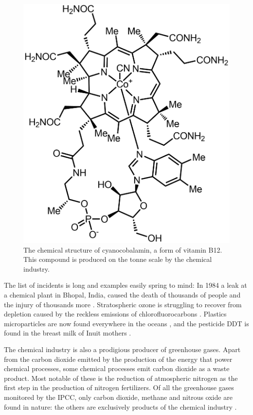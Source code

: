 \begin{figure}
\centering
\includegraphics[width=\textwidth]{Figures/Cyanocobalamin-b12.png}
\decoRule
\caption[Cyanocobalamin]{The chemical structure of cyanocobalamin, a form of vitamin B12. This compound is produced on the tonne scale by the chemical industry.}
\label{fig:vitb12}
\end{figure}

The list of incidents is long and examples easily spring to mind: In 1984 a leak
at a chemical plant in Bhopal, India, caused the death of thousands of people
and the injury of thousands more \autocite{Varma2005}.
Stratospheric ozone is struggling to recover from depletion caused by the
reckless emissions of chlorofluorocarbons \autocite{Ball2018}. Plastics
microparticles are now found everywhere in the oceans \autocite{Woodall2014},
and the pesticide DDT is found in the breast milk of Inuit mothers
\autocite{Gibson2016}.

The chemical industry is also a prodigious producer of greenhouse gases. Apart
from the carbon dioxide emitted by the production of the energy that power
chemical processes, some chemical processes emit carbon dioxide as a waste
product. Most notable of these is the reduction of atmospheric nitrogen as the
first step in the production of nitrogen fertilizers. Of all the greenhouse
gases monitored by the IPCC, only carbon dioxide, methane and nitrous oxide are
found in nature: the others are exclusively products of the chemical industry
\autocite{IPCC2014}.

